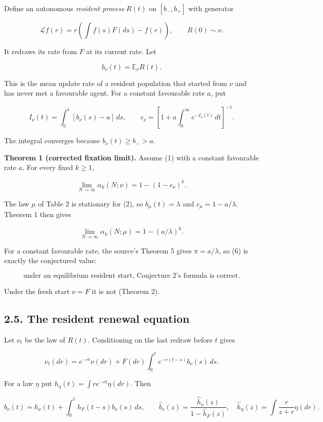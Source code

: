 \documentclass[
  british,
  11pt,
  a4paper,
]{article}
\begin{document}
Define an autonomous \emph{resident process} \(R(t)\) on \([b_-,b_+]\)
with generator

\[
\mathcal Lf(r)=r\left(\int f(s)F(ds)-f(r)\right),
\qquad R(0)\sim\nu.
\tag{2}
\]

It redraws its rate from \(F\) at its current rate. Let

\[
b_\nu(t)=\mathbb E_\nu R(t).
\tag{3}
\]

This is the mean update rate of a resident population that started from
\(\nu\) and has never met a favourable agent. For a constant favourable
rate \(a\), put

\[
I_\nu(t)=\int_0^t[b_\nu(s)-a]\,ds,\qquad
c_\nu=\left[1+a\int_0^\infty e^{-I_\nu(t)}\,dt\right]^{-1}.
\tag{4}
\]

The integral converges because \(b_\nu(t)\ge b_->a\).

\textbf{Theorem 1 (corrected fixation limit).} Assume (1) with a
constant favourable rate \(a\). For every fixed \(k\ge1\),

\[
\lim_{N\to\infty}\alpha_k(N;\nu)=1-(1-c_\nu)^k.
\tag{5}
\]

The law \(\mu\) of Table 2 is stationary for (2), so
\(b_\mu(t)=\lambda\) and \(c_\mu=1-a/\lambda\). Theorem 1 then gives

\[
\lim_{N\to\infty}\alpha_k(N;\mu)=1-(a/\lambda)^k.
\tag{6}
\]

For a constant favourable rate, the source's Theorem 5 gives
\(\pi=a/\lambda\), so (6) is exactly the conjectured value:

\[
\text{under an equilibrium resident start, Conjecture 2's formula is correct.}
\tag{7}
\]

Under the fresh start \(\nu=F\) it is not (Theorem 2).

\subsection{2.5. The resident renewal
equation}\label{the-resident-renewal-equation}

Let \(\nu_t\) be the law of \(R(t)\). Conditioning on the last redraw
before \(t\) gives

\[
\nu_t(dr)=e^{-rt}\nu(dr)
+F(dr)\int_0^t e^{-r(t-s)}b_\nu(s)\,ds.
\tag{8}
\]

For a law \(\eta\) put \(h_\eta(t)=\int r e^{-rt}\eta(dr)\). Then

\[
b_\nu(t)=h_\nu(t)+\int_0^t h_F(t-s)b_\nu(s)\,ds,
\qquad
\widehat b_\nu(z)=\frac{\widehat h_\nu(z)}{1-\widehat h_F(z)},\quad
\widehat h_\eta(z)=\int\frac r{z+r}\eta(dr).
\tag{9}
\]
\end{document}
